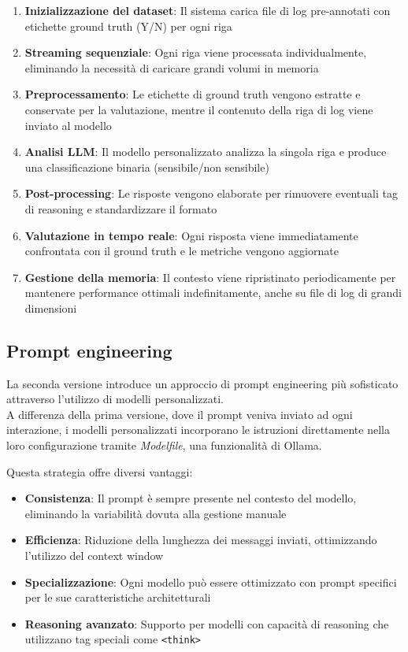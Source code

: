 \documentclass[12pt]{report}
\begin{document}
\begin{enumerate}
    \item \textbf{Inizializzazione del dataset}: Il sistema carica file di log pre-annotati con etichette ground truth (Y/N) per ogni riga
    \item \textbf{Streaming sequenziale}: Ogni riga viene processata individualmente, eliminando la necessità di caricare grandi volumi in memoria
    \item \textbf{Preprocessamento}: Le etichette di ground truth vengono estratte e conservate per la valutazione, mentre il contenuto della riga di log viene inviato al modello
    \item \textbf{Analisi LLM}: Il modello personalizzato analizza la singola riga e produce una classificazione binaria (sensibile/non sensibile)
    \item \textbf{Post-processing}: Le risposte vengono elaborate per rimuovere eventuali tag di reasoning e standardizzare il formato
    \item \textbf{Valutazione in tempo reale}: Ogni risposta viene immediatamente confrontata con il ground truth e le metriche vengono aggiornate
    \item \textbf{Gestione della memoria}: Il contesto viene ripristinato periodicamente per mantenere performance ottimali indefinitamente, anche su file di log di grandi dimensioni
\end{enumerate}

\subsection{Prompt engineering}
\label{subsec:ver2_prompt_engineering}

La seconda versione introduce un approccio di prompt engineering più sofisticato attraverso l'utilizzo di modelli personalizzati. \\
A differenza della prima versione, dove il prompt veniva inviato ad ogni interazione, i modelli personalizzati incorporano le istruzioni direttamente nella loro configurazione tramite \textit{Modelfile}, una funzionalità di Ollama.

Questa strategia offre diversi vantaggi:
\begin{itemize}
    \item \textbf{Consistenza}: Il prompt è sempre presente nel contesto del modello, eliminando la variabilità dovuta alla gestione manuale
    \item \textbf{Efficienza}: Riduzione della lunghezza dei messaggi inviati, ottimizzando l'utilizzo del context window
    \item \textbf{Specializzazione}: Ogni modello può essere ottimizzato con prompt specifici per le sue caratteristiche architetturali
    \item \textbf{Reasoning avanzato}: Supporto per modelli con capacità di reasoning che utilizzano tag speciali come \texttt{<think>}
\end{itemize}
\end{document}
